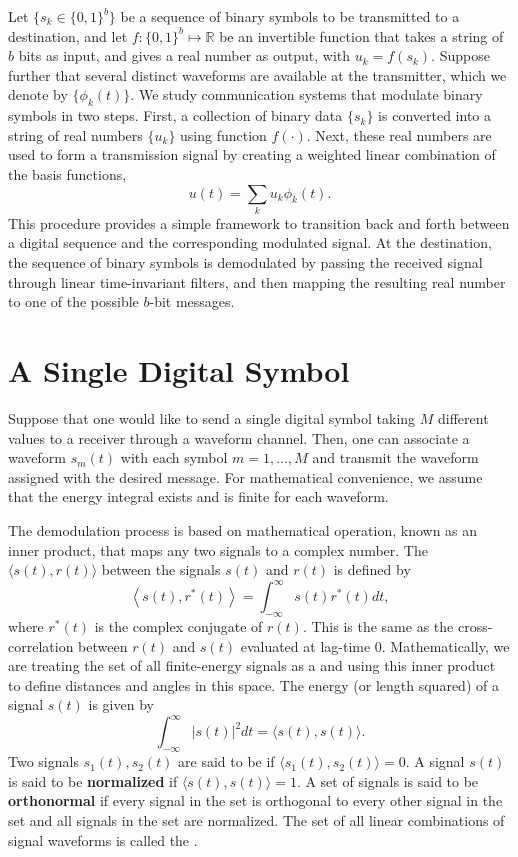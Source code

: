 Let $\{ s_k \in \{ 0, 1 \}^b \}$ be a sequence of binary symbols to be transmitted to a destination, and let $f : \{ 0, 1 \}^b \mapsto \mathbb{R}$ be an invertible function that takes a string of $b$ bits as input, and gives a real number as output, with $u_k = f(s_k)$.
Suppose further that several distinct waveforms are available at the transmitter, which we denote by $\{ \phi_k (t) \}$.
We study communication systems that modulate binary symbols in two steps.
First, a collection of binary data $\{ s_k \}$ is converted into a string of real numbers $\{ u_k \}$ using function $f(\cdot)$.
Next, these real numbers are used to form a transmission signal by creating a weighted linear combination of the basis functions,
\begin{equation*}
u(t) = \sum_k u_k \phi_k(t) .
\end{equation*}
This procedure provides a simple framework to transition back and forth between a digital sequence and the corresponding modulated signal.
At the destination, the sequence of binary symbols is demodulated by passing the received signal through linear time-invariant filters, and then mapping the resulting real number to one of the possible $b$-bit messages.
\fi

\section{A Single Digital Symbol}

Suppose that one would like to send a single digital symbol taking $M$ different values to a receiver through a waveform channel.
Then, one can associate a waveform $s_m (t)$ with each symbol $m=1,\ldots,M$ and transmit the waveform assigned with the desired message.
For mathematical convenience, we assume that the energy integral exists and is finite for each waveform.

The demodulation process is based on mathematical operation, known as an inner product, that maps any two signals to a complex number.
The  $\langle s(t) , r(t) \rangle$ between the signals $s(t)$ and $r(t)$ is defined by
\begin{equation*}
\left\langle s (t), r^* (t) \right\rangle
= \int_{-\infty}^{\infty} s(t) r^* (t) dt,
\end{equation*}
where $r^* (t)$ is the complex conjugate of $r(t)$.
This is the same as the cross-correlation between $r(t)$ and $s(t)$ evaluated at lag-time 0.
Mathematically, we are treating the set of all finite-energy signals as a  and using this inner product to define distances and angles in this space.
The energy (or length squared) of a signal $s(t)$ is given by
\[ \int_{-\infty}^{\infty} \left| s(t) \right|^2 dt = \langle s(t),s(t) \rangle. \]
Two signals $s_1 (t),s_2 (t)$ are said to be  if $\langle s_1(t),s_2 (t)\rangle = 0$.
A signal $s(t)$ is said to be \textbf{normalized} if $\langle s(t),s(t) \rangle = 1$.
A set of signals is said to be \textbf{orthonormal} if every signal in the set is orthogonal to every other signal in the set and all signals in the set are normalized.
The set of all linear combinations of signal waveforms is called the .

